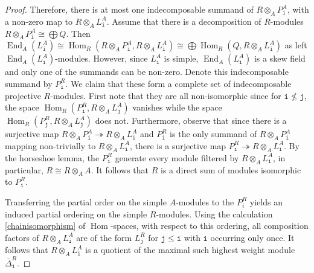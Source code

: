 \documentclass[12pt,a4paper]{amsart}
\theoremstyle{plain}
\theoremstyle{definition}
\numberwithin{equation}{thm}
\DeclareMathOperator{\Hom}{Hom}
\DeclareMathOperator{\End}{End}
\begin{document}
\begin{proof}
Therefore, there is at most one indecomposable summand of $R\otimes_A P_\mathtt{i}^A$, with a non-zero map to $R\otimes_A L_\mathtt{i}^A$. Assume that there is a decomposition of $R$-modules $R\otimes_A P_\mathtt{i}^A\cong \bigoplus Q$. Then $\End_A(L_\mathtt{i}^A)\cong \Hom_R(R\otimes_A P_\mathtt{i}^A, R\otimes_A L_\mathtt{i}^A) \cong \bigoplus \Hom_R(Q, R\otimes_A L_\mathtt{i}^A)$ as left $\End_A(L_\mathtt{i}^A)$-modules. However, since $L_\mathtt{i}^A$ is simple, $\End_A(L_\mathtt{i}^A)$ is a skew field and only one of the summands can be non-zero. Denote this indecomposable summand by $P_\mathtt{i}^R$. We claim that these form a complete set of indecomposable projective $R$-modules. First note that they are all non-isomorphic since for $\mathtt{i}\nleq \mathtt{j}$, the space $\Hom_R(P_\mathtt{i}^R, R\otimes_A L_\mathtt{j}^A)$ vanishes while the space $\Hom_R(P_\mathtt{j}^R, R\otimes_A L_\mathtt{j}^A)$ does not. Furthermore, observe that since there is a surjective map $R\otimes_A P_\mathtt{i}^A\twoheadrightarrow  R\otimes_A L_\mathtt{i}^A$ and $P_\mathtt{i}^R$ is the only summand of $R\otimes_A P_\mathtt{i}^A$ mapping non-trivially to $R\otimes_A L_\mathtt{i}^A$, there is a surjective map $P_\mathtt{i}^R\twoheadrightarrow  R\otimes_A L_\mathtt{i}^A$. By the horseshoe lemma, the $P_\mathtt{i}^R$ generate every module filtered by $R\otimes_A L_\mathtt{i}^A$, in particular, $R\cong R\otimes_A A$. It follows that $R$ is a direct sum of modules isomorphic to $P_\mathtt{i}^R$. 

Transferring the partial order on the simple $A$-modules to the $P_i^R$ yields an induced partial ordering on the simple $R$-modules. Using the calculation \eqref{chainisomorphism} of $\Hom$-spaces, with respect to this ordering, all composition factors of $R\otimes_A L_\mathtt{i}^A$ are of the form $L_\mathtt{j}^R$ for $\mathtt{j}\leq \mathtt{i}$ with $\mathtt{i}$ occurring only once. It follows that $R\otimes_A L_\mathtt{i}^A$ is a quotient of the maximal such highest weight module $\overline{\Delta}_\mathtt{i}^R$.


\end{proof}
\end{document}
